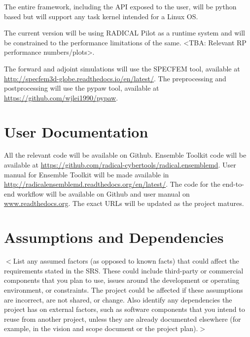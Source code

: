 \documentclass{scrreprt}
\begin{document}
The entire framework, including the API exposed to the user, will be python based but will support any task kernel intended for a Linux OS.

The current version will be using RADICAL Pilot as a runtime system and will be constrained to the performance limitations of the same. <TBA: Relevant RP performance numbers/plots>.

The forward and adjoint simulations will use the SPECFEM tool, available at \url{http://specfem3d-globe.readthedocs.io/en/latest/}. The preprocessing and postprocessing will use the pypaw tool, available at \url{https://github.com/wjlei1990/pypaw}.

\section{User Documentation}

All the relevant code will be available on Github. Ensemble Toolkit code will be available at \url{https://github.com/radical-cybertools/radical.ensemblemd}. User manual for Ensemble Toolkit will be made available in \url{http://radicalensemblemd.readthedocs.org/en/latest/}. The code for the end-to-end workflow will be available on Github and user manual on \url{www.readthedocs.org}. The exact URLs will be updated as the project matures.

\section{Assumptions and Dependencies}

$<$List any assumed factors (as opposed to known facts) that could affect the 
requirements stated in the SRS. These could include third-party or commercial 
components that you plan to use, issues around the development or operating 
environment, or constraints. The project could be affected if these assumptions 
are incorrect, are not shared, or change. Also identify any dependencies the 
project has on external factors, such as software components that you intend to 
reuse from another project, unless they are already documented elsewhere (for 
example, in the vision and scope document or the project plan).$>$


\end{document}
